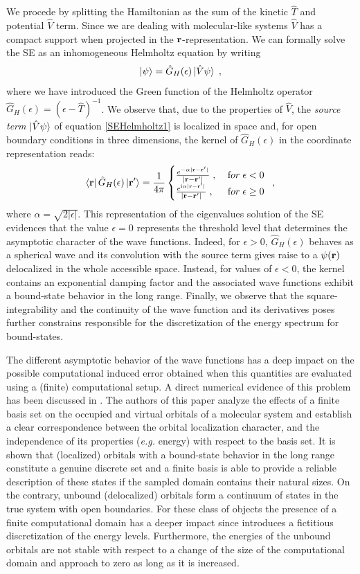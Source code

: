 \documentclass[reprint,aps,prb]{revtex4-1}
\renewcommand{\r}{{\bf r}}
\newcommand{\eps}{\epsilon}
\newcommand{\ii}{\mathrm{i}}
\newcommand{\be}{\begin{equation}}
\newcommand{\ee}{\end{equation}}
\newcommand{\lb}{\label}
\newcommand{\op}[1]{\hat {#1}}
\begin{document}
We procede by splitting the Hamiltonian as the sum of the kinetic $\op T$ and potential $\op V$ term. Since we are dealing with molecular-like systems $\op V$ has a compact support when projected in the 
$\r$-representation. We can formally solve the SE as an inhomogeneous Helmholtz equation by writing
\be\lb{SEHelmholtz1}
\ket{\psi} = \op G_H(\eps)\ket{\op V\psi}\;,
\ee
where we have introduced the Green function of the Helmholtz operator $\op G_H(\eps) = (\eps-\op T)^{-1}$. We observe that, due to the properties of $\op V$, the \emph{source term} $\ket{\op V\psi}$ 
of equation \eqref{SEHelmholtz1} is localized in space and, for open boundary conditions in three dimensions, the kernel of $\op G_H(\eps)$ in the coordinate representation reads: 
\be\lb{HelmholtzKernelDef1}
\bra{\r} \op G_H(\eps) \ket{\r'} = \frac{1}{4\pi} \begin{cases}
\frac{e^{-\alpha|\r - \r' |}}{|\r- \r' |} \;,\; & {\textrm for}\; \eps  < 0\; \\ 
\frac{e^{\ii \alpha |\r-\r' |}}{|\r-\r' |} \;, & {\textrm for} \; \eps \geq 0
\end{cases} \;,
\ee
where $\alpha = \sqrt{2|\eps|}$. 
This representation of the eigenvalues solution of the SE evidences that the value $\eps=0$ represents the threshold level that determines the asymptotic character of the wave functions. 
Indeed, for $\eps > 0$,  $\op G_H(\eps)$ behaves as a spherical wave and its convolution with the source term  gives raise to a $\psi(\r)$ delocalized in the whole accessible space. Instead, 
for values of $\eps < 0$, the kernel contains an exponential damping factor and the associated wave functions exhibit a bound-state behavior in the long range. Finally, we observe that the 
square-integrability and the continuity of the wave function and its derivatives poses further constrains responsible for the discretization of the energy spectrum for bound-states.  

The different asymptotic behavior of the wave functions has a deep impact on the possible computational induced error obtained when this quantities are evaluated using a (finite) computational
setup. 
A direct numerical evidence of this problem has been discussed in \cite{boffi2016}. The authors of this paper analyze the effects of a finite basis set on the 
occupied and virtual orbitals of a molecular system and establish a clear correspondence between the orbital localization character, and the independence of its properties (\emph{e.g.} energy) 
with respect to the basis set. It is shown that (localized) orbitals with a bound-state behavior in the long range constitute a genuine discrete set and a finite basis is 
able to provide a reliable description of these states if the sampled domain contains their natural sizes. On the contrary, unbound (delocalized) orbitals form a continuum of states in the 
true system with open boundaries. For these class of objects the presence of a finite computational domain has a deeper impact since introduces a fictitious discretization of the energy levels. 
Furthermore, the energies of the unbound orbitals are not stable with respect to a change of the size of the computational domain and approach to zero as long as it is increased.  
\end{document}
